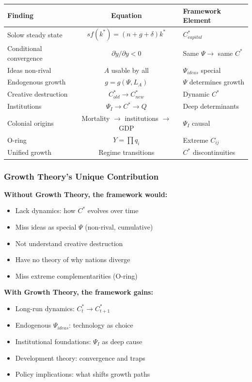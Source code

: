 \begin{center}
\renewcommand{\arraystretch}{1.5}
\begin{tabular}{|l|c|l|}
\hline
\textbf{Finding} & \textbf{Equation} & \textbf{Framework Element} \\
\hline
Solow steady state & $sf(k^*) = (n+g+\delta)k^*$ & $C^*_{capital}$ \\
\hline
Conditional convergence & $\partial \dot{y}/\partial y < 0$ & Same $\Psi \to$ same $C^*$ \\
\hline
Ideas non-rival & $A$ usable by all & $\Psi_{ideas}$ special \\
\hline
Endogenous growth & $g = g(\Psi, L_A)$ & $\Psi$ determines growth \\
\hline
Creative destruction & $C^*_{old} \to C^*_{new}$ & Dynamic $C^*$ \\
\hline
Institutions & $\Psi_I \to C^* \to Q$ & Deep determinants \\
\hline
Colonial origins & Mortality $\to$ institutions $\to$ GDP & $\Psi_I$ causal \\
\hline
O-ring & $Y = \prod q_i$ & Extreme $C_{ij}$ \\
\hline
Unified growth & Regime transitions & $C^*$ discontinuities \\
\hline
\end{tabular}
\end{center}

\subsubsection{Growth Theory's Unique Contribution}

\textbf{Without Growth Theory, the framework would:}
\begin{itemize}
    \item Lack dynamics: how $C^*$ evolves over time
    \item Miss ideas as special $\Psi$ (non-rival, cumulative)
    \item Not understand creative destruction
    \item Have no theory of why nations diverge
    \item Miss extreme complementarities (O-ring)
\end{itemize}

\textbf{With Growth Theory, the framework gains:}
\begin{itemize}
    \item Long-run dynamics: $C^*_t \to C^*_{t+1}$
    \item Endogenous $\Psi_{ideas}$: technology as choice
    \item Institutional foundations: $\Psi_I$ as deep cause
    \item Development theory: convergence and traps
    \item Policy implications: what shifts growth paths
\end{itemize}

